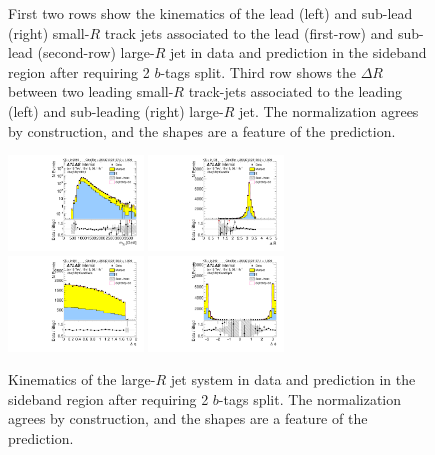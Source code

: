 \begin{figure}[htbp!]
\begin{center}
  \caption{First two rows show the kinematics of the lead (left) and sub-lead (right) small-$R$ track jets associated to the lead (first-row) and sub-lead (second-row) large-$R$ jet in data and prediction in the sideband region after requiring 2 $b$-tags split. Third row shows the $\Delta R$ between two leading small-$R$ track-jets associated to the leading (left) and sub-leading (right) large-$R$ jet. The normalization agrees by construction, and the shapes are a feature of the prediction. }
  \label{fig:boosted-2bs-sideband-ak2}
\end{center}
\end{figure}


\begin{figure}[htbp!]
\begin{center}
\includegraphics[width=0.32\textwidth,angle=-90]{figures/boosted/Sideband/b77_TwoTag_split_Sideband_mHH_l_1.pdf}
\includegraphics[width=0.32\textwidth,angle=-90]{figures/boosted/Sideband/b77_TwoTag_split_Sideband_hCandDr.pdf}\\
\includegraphics[width=0.32\textwidth,angle=-90]{figures/boosted/Sideband/b77_TwoTag_split_Sideband_hCandDeta.pdf}
\includegraphics[width=0.32\textwidth,angle=-90]{figures/boosted/Sideband/b77_TwoTag_split_Sideband_hCandDphi.pdf}
  \caption{Kinematics of the large-$R$ jet system in data and prediction in the sideband region after requiring 2 $b$-tags split. The normalization agrees by construction, and the shapes are a feature of the prediction. }
  \label{fig:boosted-2bs-sideband-ak10-system}
\end{center}
\end{figure}

